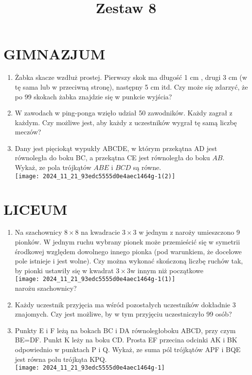 \documentclass[10pt]{article}
\title{Zestaw 8 }
\author{}
\date{}
\begin{document}
\maketitle
\section*{GIMNAZJUM}
\begin{enumerate}
  \item Żabka skacze wzdłuż prostej. Pierwszy skok ma długość 1 cm , drugi 3 cm (w tę sama lub w przeciwną stronę), następny 5 cm itd. Czy może się zdarzyć, że po 99 skokach żabka znajdzie się w punkcie wyjścia?
  \item W zawodach w ping-ponga wzięło udział 50 zawodników. Każdy zagrał z każdym. Czy możliwe jest, aby każdy z uczestników wygrał tę samą liczbę meczów?
  \item Dany jest pięciokąt wypukły ABCDE, w którym przekątna AD jest równoległa do boku BC, a przekątna CE jest równoległa do boku \(A B\). Wykaż, ze pola trójkątów \(A B E\) i \(B C D\) są równe.\\
\texttt{[image: 2024\_11\_21\_93edc5555d0e4aec1464g-1(2)]}
\end{enumerate}

\section*{LICEUM}
\begin{enumerate}
  \item Na szachownicy \(8 \times 8\) na kwadracie \(3 \times 3\) w jednym z naroży umieszczono 9 pionków. W jednym ruchu wybrany pionek może przemieścić się w symetrii środkowej względem dowolnego innego pionka (pod warunkiem, że docelowe pole istnieje i jest wolne). Czy można wykonać skończoną liczbę ruchów tak, by pionki ustawiły się w kwadrat \(3 \times 3 \mathrm{w}\) innym niż początkowe\\
\texttt{[image: 2024\_11\_21\_93edc5555d0e4aec1464g-1(1)]}\\
narożu szachownicy?
  \item Każdy uczestnik przyjęcia ma wśród pozostałych uczestników dokładnie 3 znajomych. Czy jest możliwe, by w tym przyjęciu uczestniczyło 99 osób?
  \item Punkty E i F leżą na bokach BC i DA równoległoboku ABCD, przy czym BE=DF. Punkt K leży na boku CD. Prosta EF przecina odcinki AK i BK odpowiednio w punktach P i Q. Wykaż, ze suma pól trójkątów APF i BQE jest równa polu trójkąta KPQ.\\
\texttt{[image: 2024\_11\_21\_93edc5555d0e4aec1464g-1]}
\end{enumerate}
\end{document}
